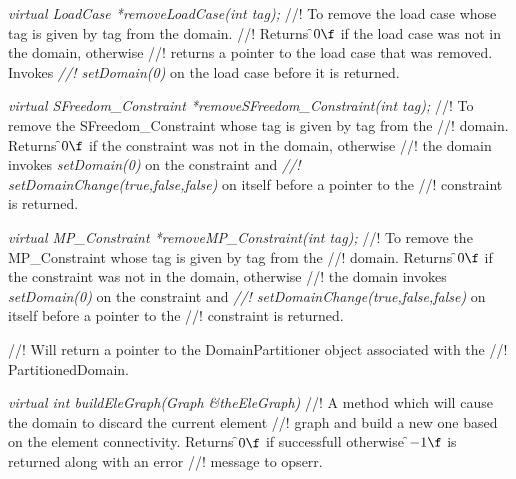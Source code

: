 {\em virtual LoadCase *removeLoadCase(int tag);}        
//! To remove the load case whose tag is given by \p tag from the domain. 
//! Returns \f$0\f$ if the load case was not in the domain, otherwise
//! returns a pointer to the load case that was removed. Invokes {\em
//! setDomain(0)} on the load case before it is returned.

{\em virtual SFreedom\_Constraint *removeSFreedom\_Constraint(int tag);}
//! To remove the SFreedom\_Constraint whose tag is given by \p tag from the
//! domain. Returns \f$0\f$ if the constraint was not in the domain, otherwise
//! the domain invokes {\em setDomain(0)} on the constraint and {\em
//! setDomainChange(true,false,false)} on itself before a pointer to the
//! constraint is returned.  

{\em virtual MP\_Constraint *removeMP\_Constraint(int tag);}
//! To remove the MP\_Constraint whose tag is given by \p tag from the
//! domain. Returns \f$0\f$ if the constraint was not in the domain, otherwise
//! the domain invokes {\em setDomain(0)} on the constraint and {\em
//! setDomainChange(true,false,false)} on itself before a pointer to the
//! constraint is returned.  




//! Will return a pointer to the DomainPartitioner object associated with the
//! PartitionedDomain.

{\em virtual int buildEleGraph(Graph \&theEleGraph)}
//! A method which will cause the domain to discard the current element
//! graph and build a new one based on the element connectivity. Returns
\f$0\f$ if successfull otherwise \f$-1\f$ is returned along with an error
//! message to opserr.

